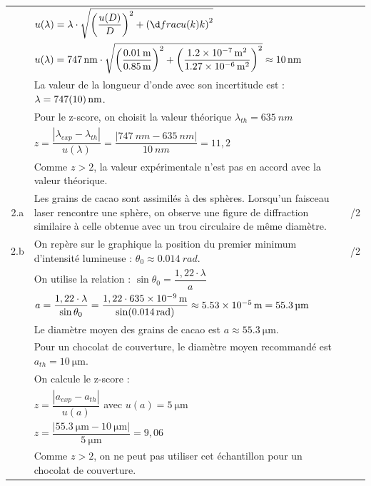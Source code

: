 \documentclass[a4paper,14pt,fleqn]{article}%
\begin{document}
\begin{table}[h!]
\begin{center}
\begin{tabular}{|c|m{15cm}|c|}
             & $u(\lambda) = \lambda \cdot \sqrt{\left(\dfrac{u(D)}{D}\right)^2 + \left(\d      frac{u(k)}{k}\right)^2}$ & \\
             & $u(\lambda) = \SI{747}{nm} \cdot \sqrt{\left(\dfrac{\SI{0,01}{m}}{\SI{0,85}{m}}\right)^2 + \left(\dfrac{\SI{1,2E-7}{\meter\squared}}{\SI{1,27E-6}{\meter\squared}}\right)^2} \approx \SI{10}{nm}$ & \\
             & La valeur de la longueur d'onde avec son incertitude est : $\lambda = \SI{747 \pm 10}{nm}$. & \\
             & Pour le z-score, on choisit la valeur théorique $\lambda_{th} = \SI{635}{nm}$ & \\
             & $z = \dfrac{|\lambda_{exp} - \lambda_{th}|}{u(\lambda)} = \dfrac{|\SI{747}{nm} - \SI{635}{nm}|}{\SI{10}{nm}} = 11,2$ & \\
             & Comme $z > 2$, la valeur expérimentale n'est pas en accord avec la valeur théorique. & \\
             \hline
            2.a & Les grains de cacao sont assimilés à des sphères. Lorsqu'un faisceau laser rencontre une sphère, on observe une figure de diffraction similaire à celle obtenue avec un trou circulaire de même diamètre. & /2\\
             \hline
            2.b & On repère sur le graphique la position du premier minimum d'intensité lumineuse : $\theta_0 \approx \SI{0,014}{rad}$. & /2\\
             & On utilise la relation : $\sin \theta_0 = \dfrac{1,22 \cdot \lambda}{a}$ & \\
             & $a = \dfrac{1,22 \cdot \lambda}{\sin \theta_0} = \dfrac{1,22 \cdot \SI{635E-9}{m}}{\sin(\SI{0,014}{rad})} \approx \SI{5,53E-5}{m} = \SI{55,3}{\micro\meter}$ & \\
             & Le diamètre moyen des grains de cacao est $a \approx \SI{55,3}{\micro\meter}$. & \\
             & Pour un chocolat de couverture, le diamètre moyen recommandé est $a_{th} = \SI{10}{\micro\meter}$. & \\
             & On calcule le z-score : & \\
             & $z = \dfrac{|a_{exp} - a_{th}|}{u(a)}$ avec $u(a) = \SI{5}{\micro\meter}$ & \\
             & $z = \dfrac{|\SI{55,3}{\micro\meter} - \SI{10}{\micro\meter}|}{\SI{5}{\micro\meter}} = 9,06$ & \\
             & Comme $z > 2$, on ne peut pas utiliser cet échantillon pour un chocolat de couverture. & \\
             \hline
        \end{tabular}
    \end{center}
\end{table}
\end{document}
